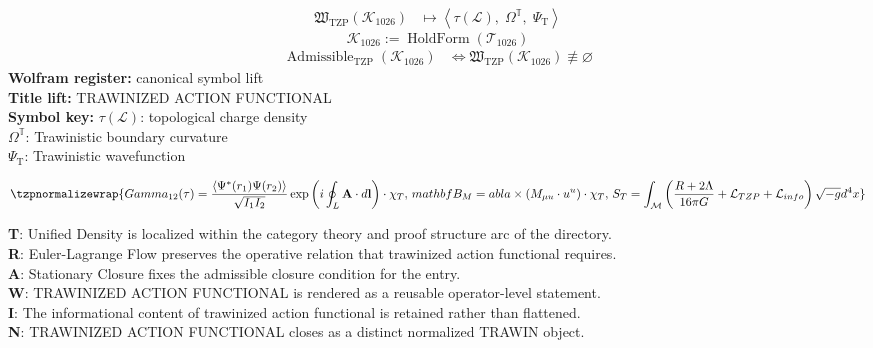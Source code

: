 \noindent
\begin{minipage}[t]{0.48\linewidth}
\begingroup
\small
\[
\begin{aligned}
\mathfrak{W}_{\mathrm{TZP}}\!\left(\mathcal{K}_{1026}\right)
&\longmapsto
\left\langle \tau(\mathcal{L}),\; \Omega^{\mathbb{T}},\; \Psi_{\mathrm{T}} \right\rangle
\end{aligned}
\]
\[
\mathcal{K}_{1026}
:=
\operatorname{HoldForm}\!\left(\mathcal{T}_{1026}\right)
\]
\[
\begin{aligned}
\operatorname{Admissible}_{\mathrm{TZP}}\!\left(\mathcal{K}_{1026}\right)
&\Longleftrightarrow
\mathfrak{W}_{\mathrm{TZP}}\!\left(\mathcal{K}_{1026}\right)\not\equiv\varnothing
\end{aligned}
\]
\textbf{Wolfram register:} canonical symbol lift\\
\textbf{Title lift:} TRAWINIZED ACTION FUNCTIONAL\\
\textbf{Symbol key:} \(\tau(\mathcal{L})\): topological charge density\\ \(\Omega^{\mathbb{T}}\): Trawinistic boundary curvature\\ \(\Psi_{\mathrm{T}}\): Trawinistic wavefunction
\par
\endgroup
\end{minipage}\hfill
\begin{minipage}[t]{0.48\linewidth}
\[
\tzpnormalizewrap{Gamma_{12}(\tau) = \frac{\langle \Psi^*(r_1)\Psi(r_2) \rangle}{\sqrt{I_1 I_2}} \exp\left( i \oint_L \mathbf{A} \cdot d\mathbf{l} \right) \cdot \chi_T,\,mathbf{B}_M =  abla \times (M_{\mu u} \cdot u^ u) \cdot \chi_T,\,S_T = \int_{\mathcal{M}} \left( \frac{R + 2\Lambda}{16\pi G} + \mathcal{L}_{TZP} + \mathcal{L}_{info} \right) \sqrt{-g} d^4x}
\]

\small
\textbf{T}: Unified Density is localized within the category theory and proof structure arc of the directory.\\
\textbf{R}: Euler-Lagrange Flow preserves the operative relation that trawinized action functional requires.\\
\textbf{A}: Stationary Closure fixes the admissible closure condition for the entry.\\
\textbf{W}: TRAWINIZED ACTION FUNCTIONAL is rendered as a reusable operator-level statement.\\
\textbf{I}: The informational content of trawinized action functional is retained rather than flattened.\\
\textbf{N}: TRAWINIZED ACTION FUNCTIONAL closes as a distinct normalized TRAWIN object.
\normalsize
\end{minipage}

